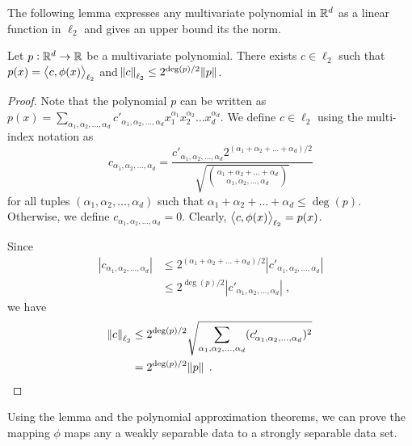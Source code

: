 The following lemma expresses any multivariate polynomial in $\mathbb{R}^d$
as a linear function in $\ell_2$ and gives an upper bound its the norm.

\begin{lemma}
\label{lemma:norm-bound}
Let $p:\mathbb{R}^d \to \mathbb{R}$ be a multivariate polynomial.
There exists $c \in \ell_2$ such that $p(x) = \left\langle c, \phi(x) \right\rangle_{\ell_2}$
and $\norm{c}_{\ell_2} \le 2^{\deg(p)/2} \norm{p}$.
\end{lemma}

\begin{proof}
Note that the polynomial $p$ can be written as
$p(x) = \sum_{\alpha_1, \alpha_2, \dots, \alpha_d} c'_{\alpha_1, \alpha_2, \dots, \alpha_d} x_1^{\alpha_1} x_2^{\alpha_2} \dots x_d^{\alpha_d}$.
We define $c \in \ell_2$ using the multi-index notation as
$$
c_{\alpha_1, \alpha_2, \dots, \alpha_d}
= \frac{c'_{\alpha_1, \alpha_2, \dots, \alpha_d} 2^{(\alpha_1 + \alpha_2 + \dots + \alpha_d)/2}}{\sqrt{\binom{\alpha_1 + \alpha_2 + \dots + \alpha_d}{\alpha_1, \alpha_2, \dots, \alpha_d}}}
$$
for all tuples $(\alpha_1, \alpha_2, \dots, \alpha_d)$ such that $\alpha_1 + \alpha_2 + \dots + \alpha_d \le \deg(p)$.
Otherwise, we define $c_{\alpha_1, \alpha_2, \dots, \alpha_d} = 0$. Clearly,
$\left\langle c, \phi(x) \right\rangle_{\ell_2} = p(x)$.

Since
\begin{align*}
|c_{\alpha_1, \alpha_2, \dots, \alpha_d}|
& \le 2^{(\alpha_1 + \alpha_2 + \dots + \alpha_d)/2} |c'_{\alpha_1, \alpha_2, \dots, \alpha_d}| \\
& \le 2^{\deg(p)/2} |c'_{\alpha_1, \alpha_2, \dots, \alpha_d}| \; ,
\end{align*}
we have
\begin{align*}
\norm{c}_{\ell_2}
& \le 2^{\deg(p)/2} \sqrt{\sum_{\alpha_1, \alpha_2, \dots, \alpha_d} (c'_{\alpha_1, \alpha_2, \dots, \alpha_d})^2} \\
& = 2^{\deg(p)/2} \norm{p} \; . \qquad \qedhere
\end{align*}
\end{proof}

Using the lemma and the polynomial approximation theorems, we can prove the
mapping $\phi$ maps any a weakly separable data to a strongly separable data
set.


